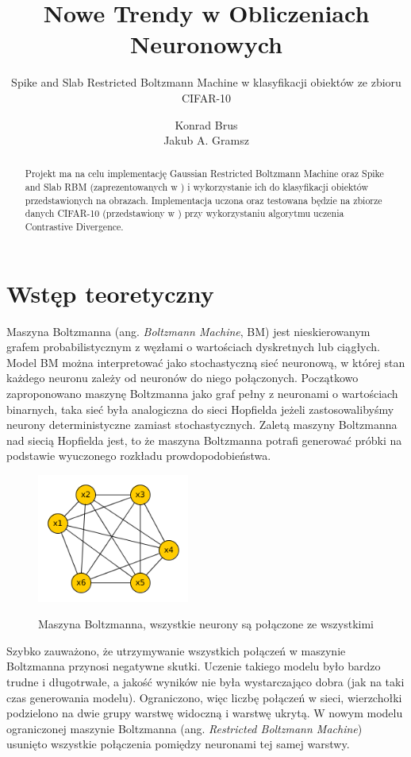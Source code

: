 \documentclass[a4paper,10pt]{article} %
\title{Nowe Trendy w Obliczeniach Neuronowych}
\subtitle{Spike and Slab Restricted Boltzmann Machine w klasyfikacji obiektów ze zbioru CIFAR-10}
\author{Konrad Brus \\ Jakub A. Gramsz}
\begin{document}
\maketitle

\begin{abstract}
Projekt ma na celu implementację Gaussian Restricted Boltzmann Machine oraz Spike and Slab RBM (zaprezentowanych w \cite{courville2013spike}) i wykorzystanie ich do klasyfikacji obiektów przedstawionych na obrazach. Implementacja uczona oraz testowana będzie na zbiorze danych CIFAR-10 (przedstawiony w \cite{cifar}) przy wykorzystaniu algorytmu uczenia Contrastive Divergence.
\end{abstract}

\section{Wstęp teoretyczny}
Maszyna Boltzmanna (ang. \textit{Boltzmann Machine}, BM) jest nieskierowanym grafem probabilistycznym z
węzłami o wartościach dyskretnych lub ciągłych. Model BM można interpretować jako stochastyczną sieć
neuronową, w której stan każdego neuronu zależy od neuronów do niego połączonych. Początkowo
zaproponowano maszynę Boltzmanna jako graf pełny z neuronami o wartościach binarnych, taka sieć była
analogiczna do sieci Hopfielda jeżeli zastosowalibyśmy neurony deterministyczne zamiast stochastycznych.
Zaletą maszyny Boltzmanna nad siecią Hopfielda jest, to że maszyna Boltzmanna potrafi generować próbki
na podstawie wyuczonego rozkładu prowdopodobieństwa.

\begin{figure}
 \centering
 \includegraphics[width=5cm]{imgs/bm.png}
 \label{fig:bm}
\caption{Maszyna Boltzmanna, wszystkie neurony są połączone ze wszystkimi}
\end{figure} 

Szybko zauważono, że utrzymywanie wszystkich połączeń w maszynie Boltzmanna przynosi negatywne skutki.
Uczenie takiego modelu było bardzo trudne i długotrwałe, a jakość wyników nie była wystarczająco dobra
(jak na taki czas generowania modelu). Ograniczono, więc liczbę połączeń w sieci, wierzchołki podzielono
na dwie grupy warstwę widoczną i warstwę ukrytą. W nowym modelu ograniczonej maszynie Boltzmanna (ang.
\textit{Restricted Boltzmann Machine}) usunięto wszystkie połączenia pomiędzy neuronami tej samej
warstwy.
\end{document}
